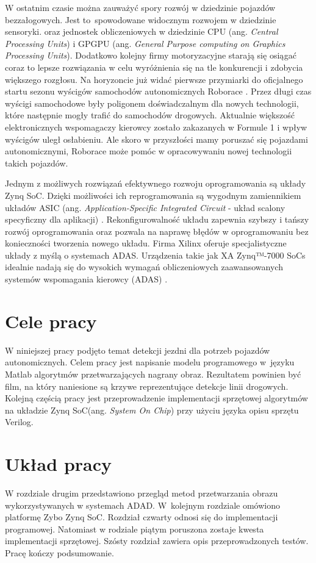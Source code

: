 W ostatnim czasie można zauważyć spory rozwój w dziedzinie pojazdów bezzałogowych. Jest to~spowodowane widocznym rozwojem w dziedzinie sensoryki. oraz jednostek obliczeniowych w dziedzinie CPU (ang. \textit{Central Processing Units}) i GPGPU (ang. \textit{General Purpose computing on Graphics Processing Units}). Dodatkowo kolejny firmy motoryzacyjne starają się osiągać coraz to lepsze rozwiązania w celu wyróżnienia się na tle konkurencji i zdobycia większego rozgłosu. Na horyzoncie już widać pierwsze przymiarki do oficjalnego startu sezonu wyścigów samochodów autonomicznych Roborace \cite{roborace}. Przez długi czas wyścigi samochodowe były poligonem doświadczalnym dla nowych technologii, które następnie mogły trafić do samochodów drogowych. Aktualnie większość elektronicznych wspomagaczy kierowcy zostało zakazanych w Formule 1 i wpływ wyścigów uległ osłabieniu. Ale skoro w przyszłości mamy poruszać się pojazdami autonomicznymi, Roborace może pomóc w opracowywaniu nowej technologii takich pojazdów.

Jednym z możliwych rozwiązań efektywnego rozwoju oprogramowania są układy Zynq SoC. Dzięki możliwości ich reprogramowania są wygodnym zamiennikiem układów ASIC (ang. \textit{Application-Specific Integrated Circuit} - układ scalony specyficzny dla aplikacji) \cite{ASIC_zynq}. Rekonfigurowalność układu zapewnia szybszy i tańszy rozwój oprogramowania oraz pozwala na naprawę błędów w oprogramowaniu bez konieczności tworzenia nowego układu.
Firma Xilinx oferuje specjalistyczne układy z myślą o systemach ADAS. Urządzenia takie jak XA Zynq™-7000 SoCs idealnie nadają się do wysokich wymagań obliczeniowych zaawansowanych systemów wspomagania kierowcy (ADAS) \cite{xilinx}.


\section{Cele pracy}
W niniejszej pracy podjęto temat detekcji jezdni dla potrzeb pojazdów autonomicznych.  
Celem pracy jest napisanie modelu programowego w~języku Matlab algorytmów przetwarzających nagrany obraz. 
Rezultatem powinien być film, na który naniesione są krzywe reprezentujące detekcje linii drogowych.
Kolejną częścią pracy jest przeprowadzenie implementacji sprzętowej algorytmów na układzie Zynq SoC(ang. \textit{System On Chip}) przy użyciu języka opisu sprzętu Verilog. 
\section{Układ pracy}
W rozdziale drugim przedstawiono przegląd metod przetwarzania obrazu wykorzystywanych w systemach ADAD. 
W~kolejnym rozdziale omówiono platformę Zybo Zynq SoC. 
Rozdział czwarty odnosi się do implementacji programowej. Natomiast w rodziale piątym poruszona zostaje kwesta implementacji sprzętowej. Szósty rozdział zawiera opis przeprowadzonych testów. Pracę kończy podsumowanie.